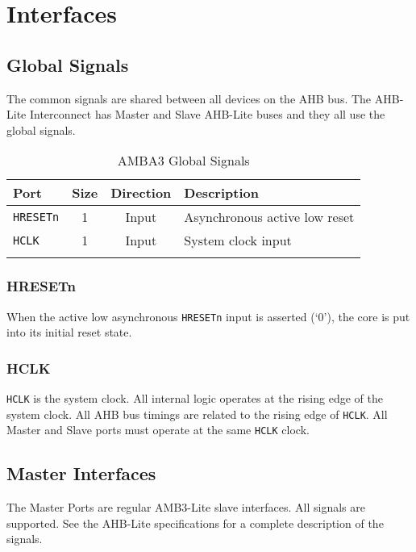 \chapter{Interfaces}\label{interfaces}


\section{Global Signals}\label{global-signals}

The common signals are shared between all devices on the AHB bus. The
AHB-Lite Interconnect has Master and Slave AHB-Lite buses and they all
use the global signals.

\begin{longtable}[]{@{}lccl@{}}
\toprule
Port & Size & Direction & Description\tabularnewline
\midrule
\endhead
\texttt{HRESETn} & 1 & Input & Asynchronous active low reset\tabularnewline
\texttt{HCLK} & 1 & Input & System clock input\tabularnewline
\bottomrule
\caption{AMBA3 Global Signals}
\end{longtable}

\subsection{HRESETn}\label{hresetn}

When the active low asynchronous \texttt{HRESETn} input is asserted (`0'), the
core is put into its initial reset state.

\subsection{HCLK}\label{hclk}

\texttt{HCLK} is the system clock. All internal logic operates at the rising edge
of the system clock. All AHB bus timings are related to the rising edge
of \texttt{HCLK}. All Master and Slave ports must operate at the same \texttt{HCLK} clock.

\section{Master Interfaces}\label{master-interfaces}

The Master Ports are regular AMB3-Lite slave interfaces. All signals are
supported. See the AHB-Lite specifications for a complete description of
the signals.

